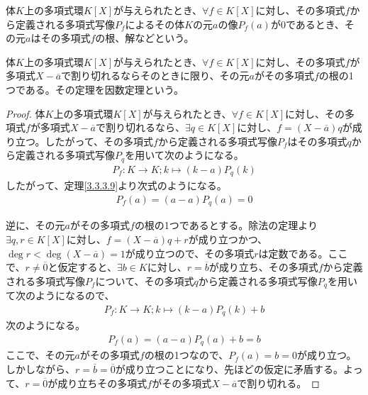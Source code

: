 \documentclass[dvipdfmx]{jsarticle}
\begin{document}
\begin{dfn}
体$K$上の多項式環$K[ X]$が与えられたとき、$\forall f \in K[ X]$に対し、その多項式$f$から定義される多項式写像$P_{f}$によるその体$K$の元$a$の像$P_{f}(a)$が$0$であるとき、その元$a$はその多項式$f$の根、解などという。
\end{dfn}
\begin{thm}[因数定理]\label{3.3.5.2}
体$K$上の多項式環$K[ X]$が与えられたとき、$\forall f \in K[ X]$に対し、その多項式$f$が多項式$X - \overline{a}$で割り切れるならそのときに限り、その元$a$がその多項式$f$の根の1つである。その定理を因数定理という。
\end{thm}
\begin{proof}
体$K$上の多項式環$K[ X]$が与えられたとき、$\forall f \in K[ X]$に対し、その多項式$f$が多項式$X - \overline{a}$で割り切れるなら、$\exists q \in K[ X]$に対し、$f = \left( X - \overline{a} \right)q$が成り立つ。したがって、その多項式$f$から定義される多項式写像$P_{f}$はその多項式$q$から定義される多項式写像$P_{q}$を用いて次のようになる。
\begin{align*}
P_{f}:K \rightarrow K;k \mapsto (k - a)P_{q}(k)
\end{align*}
したがって、定理\ref{3.3.3.9}より次式のようになる。
\begin{align*}
P_{f}(a) = (a - a)P_{q}(a) = 0
\end{align*}\par
逆に、その元$a$がその多項式$f$の根の1つであるとする。除法の定理より$\exists q,r \in K[ X]$に対し、$f = \left( X - \overline{a} \right)q + r$が成り立つかつ、$\deg r < \deg\left( X - \overline{a} \right) = 1$が成り立つので、その多項式$r$は定数である。ここで、$r \neq \overline{0}$と仮定すると、$\exists b \in K$に対し、$r = \overline{b}$が成り立ち、その多項式$f$から定義される多項式写像$P_{f}$について、その多項式$q$から定義される多項式写像$P_{q}$を用いて次のようになるので、
\begin{align*}
P_{f}:K \rightarrow K;k \mapsto (k - a)P_{q}(k) + b
\end{align*}
次のようになる。
\begin{align*}
P_{f}(a) = (a - a)P_{q}(a) + b = b
\end{align*}
ここで、その元$a$がその多項式$f$の根の1つなので、$P_{f}(a) = b = 0$が成り立つ。しかしながら、$r = \overline{b} = \overline{0}$が成り立つことになり、先ほどの仮定に矛盾する。よって、$r = \overline{0}$が成り立ちその多項式$f$がその多項式$X - \overline{a}$で割り切れる。
\end{proof}
\end{document}
